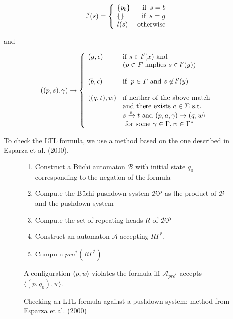 \documentclass[11pt]{article}
\theoremstyle{definition}
\begin{document}
\begin{displaymath}
   l'(s) =  \left\{
     \begin{array}{lr}
       \{p_b\} & \text{if} \hspace{2mm} s = b\\
       \{\} & \text{if}  \hspace{2mm} s = g \\
       l(s) & \text{otherwise}
     \end{array}
   \right.
\end{displaymath}
   
and 

\begin{displaymath}
   ((p,s),\gamma) \rightarrow \left\{
     \begin{array}{ll}
       (g, \epsilon) & \text{if } s \in l'(x) \text{ and} \\
                     & (p \in F \text{ implies } s \in l'(y)) \\
       & \\
       (b, \epsilon) & \text{if}  \hspace{2mm} p \in F \text{ and } s \not \in l'(y) \\
       & \\
       ((q,t),w)     & \text{if neither of the above match} \\
                     & \text{and there exists } a \in \Sigma \text{ s.t. } \\
                     & s \xrightarrow{a} t \text{ and } (p, a, \gamma) \rightarrow (q, w) \\
                     & \text{ for some } \gamma \in \Gamma, w \in \Gamma^*
     \end{array}
   \right.
\end{displaymath}

To check the LTL formula, we use a method based on the one described in Esparza et al. (2000)\cite{EHRS00b}.

\begin{figure}[h!]
\caption{Checking an LTL formula against a pushdown system: method from Esparza et al. (2000)\cite{EHRS00b} }
\begin{enumerate}
\item{Construct a B\"{u}chi automaton $\mathcal{B}$ with initial state $q_0$ corresponding to the negation of the formula}
\item{Compute the B\"{u}chi pushdown system $\mathcal{BP}$ as the product of $\mathcal{B}$ and the pushdown system}
\item{Compute the set of repeating heads $R$ of $\mathcal{BP}$}
\item{Construct an automaton $\mathcal{A}$ accepting $R\Gamma^*$.}
\item{Compute $pre^*(R\Gamma^*)$}
\end{enumerate}
A configuration $\langle p, w \rangle$ violates the formula iff $\mathcal{A}_{pre^*}$ accepts $\langle (p, q_0 ), w\rangle$.

\end{figure}
\end{document}
